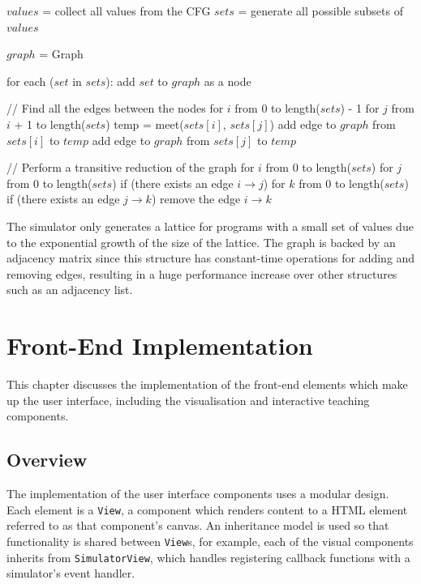 \documentclass[bsc,twoside,singlespacing,parskip,logo,notimes,normalheadings]{infthesis}
\begin{document}
        \begin{algorithm}[caption={Constructing a \gls{hassediagram} for the \gls{meetsemilattice} of a \gls{cfg}.}, label={algo:lattice_construction},mathescape=true]
$values$ = collect all values from the CFG
$sets$ = generate all possible subsets of $values$

$graph$ = Graph

for each ($set$ in $sets$):
    add $set$ to $graph$ as a node

// Find all the edges between the nodes
for $i$ from 0 to length($sets$) - 1
    for $j$ from $i$ + 1 to length($sets$)
        temp = meet($sets[i]$, $sets[j]$)
        add edge to $graph$ from $sets[i]$ to $temp$
        add edge to $graph$ from $sets[j]$ to $temp$

// Perform a transitive reduction of the graph
for $i$ from 0 to length($sets$)
    for $j$ from 0 to length($sets$)
        if (there exists an edge $i \rightarrow j$)
            for $k$ from 0 to length($sets$)
                if (there exists an edge $j \rightarrow k$)
                    remove the edge $i \rightarrow k$
        \end{algorithm}

        The simulator only generates a lattice for programs with a
        small set of values due to the exponential growth of the size
        of the lattice. The graph is backed by an adjacency matrix
        since this structure has constant-time operations for adding
        and removing edges, resulting in a huge performance increase
        over other structures such as an adjacency list.

\chapter{Front-End Implementation}\label{chap:impl-frontend}
This chapter discusses the implementation of the front-end elements
which make up the user interface, including the visualisation and
interactive teaching components.

    \section{Overview}
    The implementation of the user interface components uses a modular
    design. Each element is a {\tt View}, a component which renders
    content to a HTML element referred to as that component's
    canvas. An inheritance model is used so that functionality is
    shared between {\tt View}s, for example, each of the visual
    components inherits from {\tt SimulatorView}, which handles
    registering callback functions with a simulator's event handler.
\end{document}
